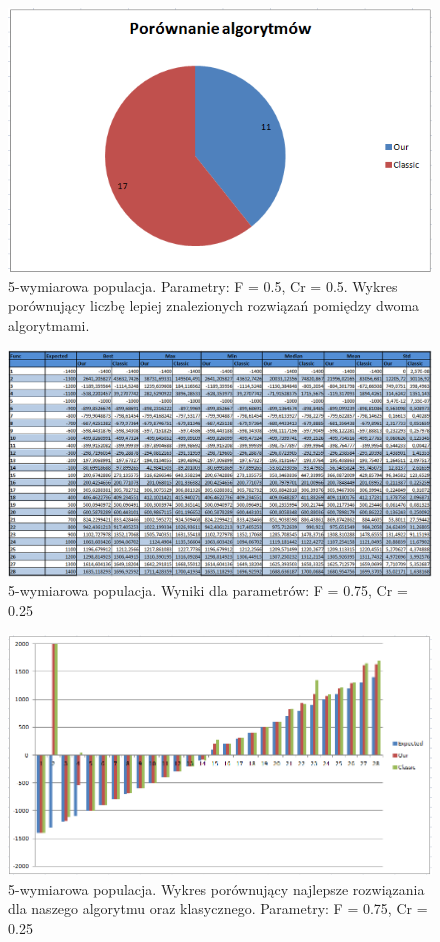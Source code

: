 \documentclass[a4paper]{article}
\begin{document}
\begin{figure}[!h]
\centering
\includegraphics[width=\textwidth]{F5Cr5L5statystyka.png}
\caption{5-wymiarowa populacja. Parametry: F = 0.5, Cr = 0.5. Wykres porównujący liczbę lepiej znalezionych rozwiązań pomiędzy dwoma algorytmami.}
\end{figure}

\begin{figure}[!h]
\centering
\includegraphics[width=\textwidth]{F75Cr25L5tab.png}
\caption{5-wymiarowa populacja. Wyniki dla parametrów: F = 0.75, Cr = 0.25}
\end{figure}

\begin{figure}[!h]
\centering
\includegraphics[width=\textwidth]{F75Cr25L5chart.png}
\caption{5-wymiarowa populacja. Wykres porównujący najlepsze rozwiązania dla naszego algorytmu oraz klasycznego. Parametry: F = 0.75, Cr = 0.25}
\end{figure}
\end{document}
